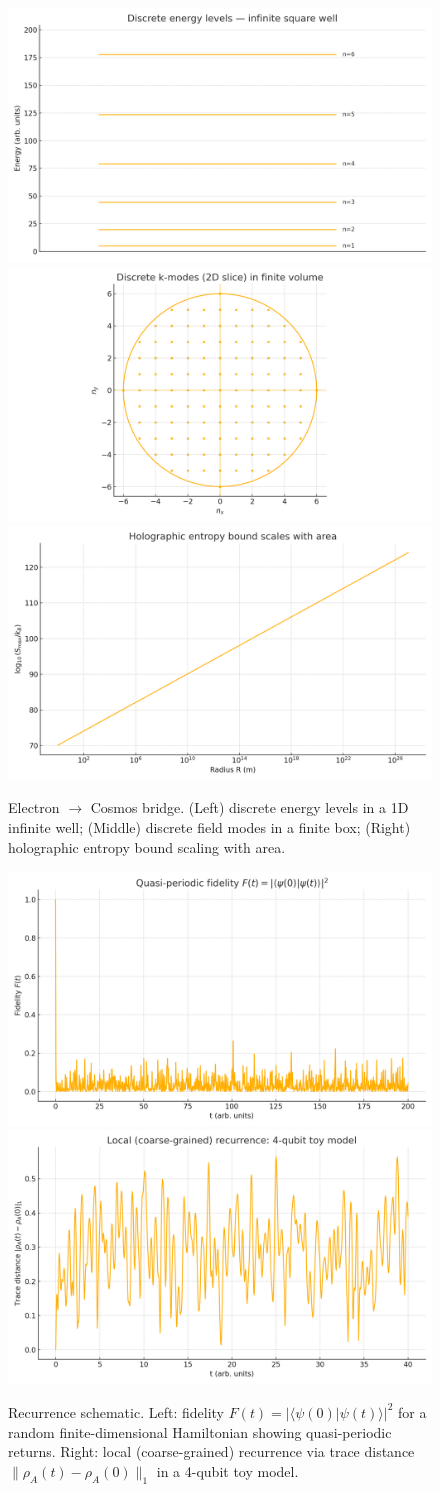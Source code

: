 \documentclass[12pt]{article}
\theoremstyle{remark}
\begin{document}
\begin{figure}[h]
  \centering
\includegraphics[width=0.32\linewidth]{fig_energy_levels}
\includegraphics[width=0.32\linewidth]{fig_k_modes}
\includegraphics[width=0.32\linewidth]{fig_holographic_bound}
  \caption{Electron $\to$ Cosmos bridge. (Left) discrete energy levels in a 1D infinite well; (Middle) discrete field modes in a finite box; (Right) holographic entropy bound scaling with area.}
\end{figure}



\begin{figure}[h]
  \centering
\includegraphics[width=0.48\linewidth]{figs/fig_fidelity.png}
\includegraphics[width=0.48\linewidth]{figs/fig_trace_distance.png}
  \caption{Recurrence schematic. Left: fidelity $F(t)=|\langle\psi(0)|\psi(t)\rangle|^2$ for a random finite-dimensional Hamiltonian showing quasi-periodic returns. Right: local (coarse-grained) recurrence via trace distance $\|\rho_A(t)-\rho_A(0)\|_1$ in a 4-qubit toy model.}
\end{figure}
\end{document}

